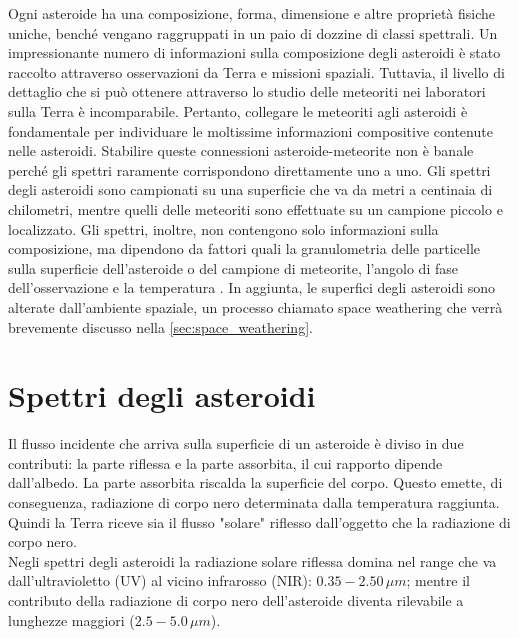 \documentclass[a4paper,11pt,openright]{book}
\begin{document}
Ogni asteroide ha una composizione, forma, dimensione e altre proprietà fisiche uniche, benché vengano raggruppati in un paio di dozzine di classi spettrali. Un impressionante numero di informazioni sulla composizione degli asteroidi è stato raccolto attraverso osservazioni da Terra e missioni spaziali. Tuttavia, il livello di dettaglio che si può ottenere attraverso lo studio delle meteoriti nei laboratori sulla Terra è incomparabile. Pertanto, collegare le meteoriti agli asteroidi è fondamentale per individuare le moltissime informazioni compositive contenute nelle asteroidi. Stabilire queste connessioni asteroide-meteorite non è banale perché gli spettri raramente corrispondono direttamente uno a uno. Gli spettri degli asteroidi sono campionati su una superficie che va da metri a centinaia di chilometri, mentre quelli delle meteoriti sono effettuate su un campione piccolo e localizzato. Gli spettri, inoltre, non contengono solo informazioni sulla composizione, ma dipendono da fattori quali la granulometria delle particelle sulla superficie dell'asteroide o del campione di meteorite, l'angolo di fase dell'osservazione e la temperatura \citep{demeo_connecting_2022}. In aggiunta, le superfici degli asteroidi sono alterate dall'ambiente spaziale, un processo chiamato space weathering che verrà brevemente discusso nella \cref{sec:space_weathering}.



\section{Spettri degli asteroidi}
Il flusso incidente che arriva sulla superficie di un asteroide è diviso in due contributi: la parte riflessa e la parte assorbita, il cui rapporto dipende dall'albedo. La parte assorbita riscalda la superficie del corpo. Questo emette, di conseguenza, radiazione di corpo nero determinata dalla temperatura raggiunta. Quindi la Terra riceve sia il flusso "solare" riflesso dall'oggetto che la radiazione di corpo nero.\\
Negli spettri degli asteroidi la radiazione solare riflessa domina nel range che va dall'ultravioletto (UV) al vicino infrarosso (NIR): $0.35-2.50\,\mu m$; mentre il contributo della radiazione di corpo nero dell'asteroide diventa rilevabile a lunghezze maggiori ($2.5-5.0\,\mu m$).
\end{document}
